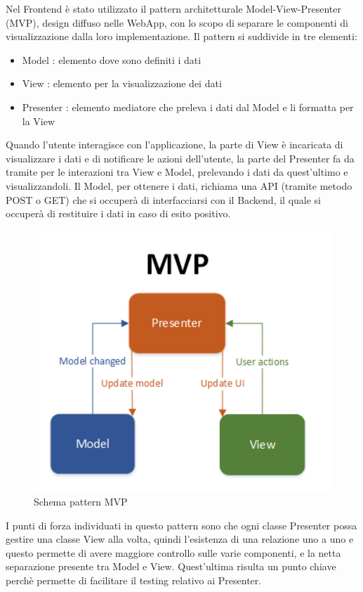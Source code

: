 Nel Frontend è stato utilizzato il pattern architetturale Model-View-Presenter (MVP), design diffuso nelle WebApp, con lo scopo di separare le componenti di
visualizzazione dalla loro implementazione.
Il pattern si suddivide in tre elementi:
\begin{itemize}
    \item Model : elemento dove sono definiti i dati
    \item View : elemento per la visualizzazione dei dati
    \item Presenter : elemento mediatore che preleva i dati dal Model e li formatta per la View
\end{itemize}
Quando l'utente interagisce con l'applicazione, la parte di View è incaricata di visualizzare i dati 
e di notificare le azioni dell'utente, la parte del Presenter fa da tramite per le interazioni tra View e Model, prelevando i dati da quest'ultimo e visualizzandoli.
Il Model, per ottenere i dati, richiama una API (tramite metodo POST o GET) che si occuperà di interfacciarsi con
il Backend, il quale si occuperà di restituire i dati in caso di esito positivo.


\begin{figure}[!h]
    \includegraphics[width=16cm]{sezioni/images/mvp.png}
    \centering
    \caption{Schema pattern MVP}
\end{figure}

I punti di forza individuati in questo pattern sono che ogni classe Presenter possa gestire 
una classe View alla volta, quindi l'esistenza di una relazione uno a uno e questo permette di avere maggiore 
controllo sulle varie componenti, e la netta separazione presente tra Model e View. 
Quest'ultima risulta un punto chiave perchè permette di facilitare il testing relativo ai Presenter.

